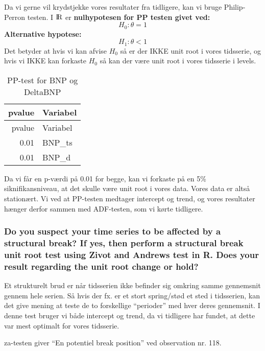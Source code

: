 \documentclass[
  10pt,
]{article}
\begin{document}
Da vi gerne vil krydstjekke vores resultater fra tidligere, kan vi bruge
Philip-Perron testen. I \({\rm I\!R}\) er
\textbf{nulhypotesen for PP testen givet ved:}
\[H_0: \theta = 1 \tag{Unit root} \] \textbf{Alternative hypotese:}
\[H_1: \theta < 1 \tag{No unit root} \] Det betyder at hvis vi kan
afvise \(H_0\) så er der IKKE unit root i vores tidsserie, og hvis vi
IKKE kan forkaste \(H_0\) så kan der være unit root i vores tidsserie i
levels.

\begin{longtable}[]{@{}rl@{}}
\caption{PP-test for BNP og DeltaBNP}\tabularnewline
\toprule
pvalue & Variabel\tabularnewline
\midrule
\endfirsthead
\toprule
pvalue & Variabel\tabularnewline
\midrule
\endhead
0.01 & BNP\_ts\tabularnewline
0.01 & BNP\_d\tabularnewline
\bottomrule
\end{longtable}

Da vi får en p-værdi på 0.01 for begge, kan vi forkaste på en 5\%
siknifikansniveau, at det skulle være unit root i vores data. Vores data
er altså stationært. Vi ved at PP-testen medtager intercept og trend, og
vores resultater hænger derfor sammen med ADF-testen, som vi kørte
tidligere.

\hypertarget{do-you-suspect-your-time-series-to-be-affected-by-a-structural-break-if-yes-then-perform-a-structural-break-unit-root-test-using-zivot-and-andrews-test-in-r.-does-your-result-regarding-the-unit-root-change-or-hold}{%
\subsubsection{Do you suspect your time series to be affected by a
structural break? If yes, then perform a structural break unit root test
using Zivot and Andrews test in R. Does your result regarding the unit
root change or
hold?}\label{do-you-suspect-your-time-series-to-be-affected-by-a-structural-break-if-yes-then-perform-a-structural-break-unit-root-test-using-zivot-and-andrews-test-in-r.-does-your-result-regarding-the-unit-root-change-or-hold}}

Et strukturelt brud er når tidsserien ikke befinder sig omkring samme
gennemsnit gennem hele serien. Så hvis der fx. er et stort spring/stød
et sted i tidsserien, kan det give mening at teste de to forskellige
``perioder'' med hver deres gennemsnit. I denne test bruger vi både
intercept og trend, da vi tidligere har fundet, at dette var mest
optimalt for vores tidsserie.

za-testen giver ``En potentiel break position'' ved observation nr. 118.
\end{document}
